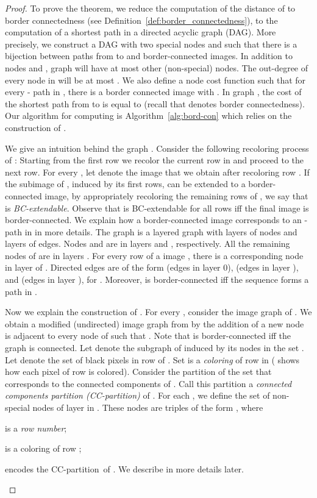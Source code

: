 \documentclass[11pt,english]{article}
\renewenvironment{itemize}[1]{\begin{compactitem}#1}{\end{compactitem}}
\numberwithin{figure}{section}
\begin{document}
\begin{proof}
\newcommand{\cG}{{\mathcal G}}
\newcommand{\col}{\chi}
\newcommand{\cc}{CC-partition}
To prove the theorem, we reduce the computation of the distance of  to border connectedness (see Definition~\ref{def:border_connectedness}), to the computation of a shortest path in a directed acyclic graph (DAG). More precisely, we construct a DAG  with two special nodes  and  such that there is a bijection between paths from  to  and  border-connected images. In addition to nodes  and , graph  will have at most  other (non-special) nodes. The out-degree of every node in  will be at most . We also define a node cost function  such that for
every - path  in , there is a border connected image  with . In graph , the cost of the shortest path from  to  is equal to  (recall that  denotes border connectedness). Our algorithm for computing  is Algorithm~\ref{alg:bord-con} which relies on the construction of .

We give an intuition behind the graph . Consider the following recoloring process of : Starting from the first row we recolor the current row in  and proceed to the next row. For every , let  denote the image that we obtain after recoloring row . If the subimage of , induced by its first  rows, can be extended to a border-connected image, by appropriately recoloring the remaining rows of , we say that  is {\em BC-extendable}. Observe that  is BC-extendable for all rows  iff the final image  is border-connected. We explain how a border-connected image corresponds to an - path in  in more details. The graph  is a layered graph with  layers of nodes and  layers of edges. Nodes  and  are in layers  and , respectively. All the remaining nodes of  are in layers . For every row  of a  image , there is a corresponding node  in layer  of . Directed edges are of the form  (edges in layer 0),  (edges in layer ), and  (edges in layer ), for . Moreover,  is border-connected iff the sequence  forms a path in .

Now we explain the construction of . For every , consider the image graph  of . We obtain a modified (undirected) image graph  from  by the addition of a new node  is adjacent to every node  of  such that . Note that  is border-connected iff the graph  is connected. Let  denote the subgraph of  induced by its nodes in the set . Let  denote the set of black pixels in row  of . Set  is a {\em coloring} of row  in  ( shows how each pixel of row  is colored). Consider the partition of the set  that corresponds to the connected components of . Call this partition a {\em connected components partition (\cc)} of . For each , we define the set of non-special nodes of layer  in . These nodes are triples of the form , where
\begin{itemize}
\item
 is a {\em row number};
\item
 is a coloring of row ;
\item
 encodes the \cc\ of . We describe  in more details later.
\end{itemize}


\end{proof}
\end{document}
